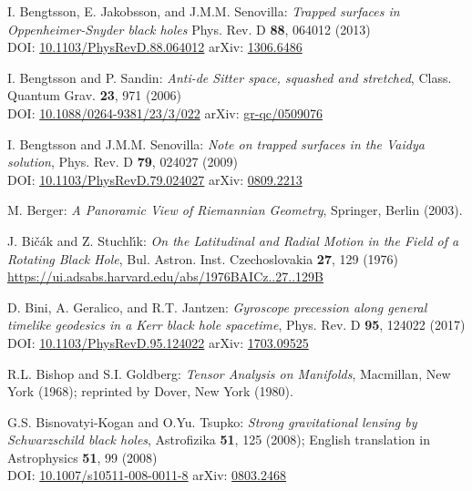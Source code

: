 \begin{thebibliography}{123}
I. Bengtsson, E. Jakobsson, and J.M.M. Senovilla:
{\em Trapped surfaces in Oppenheimer-Snyder black holes}
Phys. Rev. D {\bf 88}, 064012 (2013)\\
DOI: \href{https://doi.org/10.1103/PhysRevD.88.064012}{10.1103/PhysRevD.88.064012}\hfill
arXiv: \href{https://arxiv.org/abs/1306.6486}{1306.6486}

I. Bengtsson and P. Sandin:
{\em Anti-de Sitter space, squashed and stretched},
Class. Quantum Grav. {\bf 23}, 971 (2006)\\
DOI: \href{https://doi.org/10.1088/0264-9381/23/3/022}{10.1088/0264-9381/23/3/022}\hfill
arXiv: \href{https://arxiv.org/abs/gr-qc/0509076}{gr-qc/0509076}

I. Bengtsson and J.M.M. Senovilla:
{\em Note on trapped surfaces in the Vaidya solution},
Phys. Rev. D {\bf 79}, 024027 (2009)\\
DOI: \href{https://doi.org/10.1103/PhysRevD.79.024027}{10.1103/PhysRevD.79.024027}\hfill
arXiv: \href{https://arxiv.org/abs/0809.2213}{0809.2213}

M. Berger: {\em A Panoramic View of Riemannian Geometry},
Springer, Berlin (2003).

J. Bi\v{c}\'{a}k and Z. Stuchl\'{\i}k:
{\em On the Latitudinal and Radial Motion in the Field of a Rotating Black Hole},
Bul. Astron. Inst. Czechoslovakia {\bf 27}, 129 (1976)\\
\url{https://ui.adsabs.harvard.edu/abs/1976BAICz..27..129B}

D. Bini, A. Geralico, and R.T. Jantzen:
{\em Gyroscope precession along general timelike geodesics in a Kerr black hole spacetime},
Phys. Rev. D {\bf 95}, 124022 (2017)\\
DOI: \href{https://doi.org/10.1103/PhysRevD.95.124022}{10.1103/PhysRevD.95.124022}\hfill
arXiv: \href{https://arxiv.org/abs/1703.09525}{1703.09525}

R.L. Bishop and S.I. Goldberg:
{\em Tensor Analysis on Manifolds},
Macmillan, New York (1968); reprinted by Dover, New York (1980).

G.S. Bisnovatyi-Kogan and O.Yu. Tsupko:
{\em Strong gravitational lensing by Schwarzschild black holes},
Astrofizika {\bf 51}, 125 (2008); English translation in
Astrophysics {\bf 51}, 99 (2008)\\
DOI: \href{https://doi.org/10.1007/s10511-008-0011-8}{10.1007/s10511-008-0011-8}\hfill
arXiv: \href{https://arxiv.org/abs/0803.2468}{0803.2468}


\end{thebibliography}
